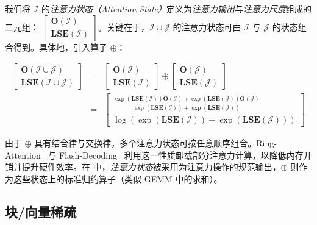 我们将 \(\mathcal{I}\) 的\emph{注意力状态（Attention State）}定义为\emph{注意力输出}与\emph{注意力尺度}组成的二元组：
\(\begin{bmatrix}\mathbf{O}(\mathcal{I}) \\ \mathbf{LSE}(\mathcal{I}) \end{bmatrix}\)。关键在于，\(\mathcal{I}\cup\mathcal{J}\) 的注意力状态可由 \(\mathcal{I}\) 与 \(\mathcal{J}\) 的状态组合得到。具体地，引入算子 \(\oplus\)：

\vspace{-1em}
\begin{eqnarray*}
   \begin{bmatrix} \mathbf{O}(\mathcal{I \cup J}) \\ \mathbf{LSE}(\mathcal{I \cup J}) \end{bmatrix} & \!\!\!\!\!\!=\!\!\!\!\!\! &
    \begin{bmatrix} \mathbf{O}(\mathcal{I}) \\ \mathbf{LSE}(\mathcal{I}) \end{bmatrix} \oplus \begin{bmatrix} \mathbf{O}(\mathcal{J}) \\ \mathbf{LSE}(\mathcal{J}) \end{bmatrix} \\ \ & \!\!\!\!\!\! = \!\!\!\!\!\! & 
    \begin{bmatrix} 
        \frac{\exp(\mathbf{LSE}(\mathcal{I})) \mathbf{O}(\mathcal{I}) + \exp(\mathbf{LSE}(\mathcal{J})) \mathbf{O}(\mathcal{J})}{\exp(\mathbf{LSE}(\mathcal{I})) + \exp(\mathbf{LSE}(\mathcal{J}))}
        \\ \log(\exp(\mathbf{LSE}(\mathcal{I})) + \exp(\mathbf{LSE}(\mathcal{J}))) \end{bmatrix}
\end{eqnarray*}
\vspace{-1em}

由于 \(\oplus\) 具有结合律与交换律，多个注意力状态可按任意顺序组合。Ring-Attention~\cite{liu2023ring} 与 Flash-Decoding~\cite{dao2023flash-decoding} 利用这一性质卸载部分注意力计算，以降低内存开销并提升硬件效率。在 \sys 中，\emph{注意力状态}被采用为注意力操作的规范输出，\(\oplus\) 则作为这些状态上的标准归约算子（类似 GEMM 中的求和）。

\subsection{块/向量稀疏}

\label{sec:block-sparse}

